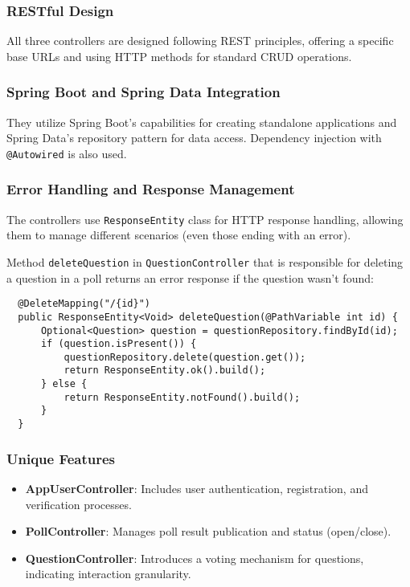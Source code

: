 \subsubsection{RESTful Design}
All three controllers are designed following REST principles, offering a specific base URLs and using HTTP methods for standard CRUD operations.

\subsubsection{Spring Boot and Spring Data Integration}
They utilize Spring Boot's capabilities for creating standalone applications and Spring Data's repository pattern for data access. Dependency injection with \texttt{@Autowired} is also used.

\subsubsection{Error Handling and Response Management}
The controllers use \texttt{ResponseEntity} class for HTTP response handling, allowing them to manage different scenarios (even those ending with an error).

Method \texttt{deleteQuestion} in \texttt{QuestionController} that is responsible for deleting a question in a poll returns an error response if the question wasn't found:
\begin{verbatim}
  @DeleteMapping("/{id}")
  public ResponseEntity<Void> deleteQuestion(@PathVariable int id) {
      Optional<Question> question = questionRepository.findById(id);
      if (question.isPresent()) {
          questionRepository.delete(question.get());
          return ResponseEntity.ok().build();
      } else {
          return ResponseEntity.notFound().build();
      }
  }
\end{verbatim}

\subsubsection{Unique Features}
\begin{itemize}
    \item \textbf{AppUserController}: Includes user authentication, registration, and verification processes.
    \item \textbf{PollController}: Manages poll result publication and status (open/close).
    \item \textbf{QuestionController}: Introduces a voting mechanism for questions, indicating interaction granularity.
\end{itemize}

